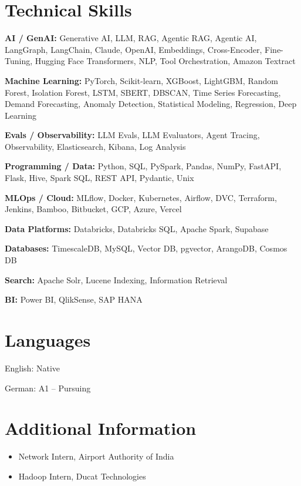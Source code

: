 \documentclass[10pt,a4paper]{article}
\begin{document}
\section{Technical Skills}
\textbf{AI / GenAI:} Generative AI, LLM, RAG, Agentic RAG, Agentic AI, LangGraph, LangChain, Claude, OpenAI, Embeddings, Cross-Encoder, Fine-Tuning, Hugging Face Transformers, NLP, Tool Orchestration, Amazon Textract\par
\textbf{Machine Learning:} PyTorch, Scikit-learn, XGBoost, LightGBM, Random Forest, Isolation Forest, LSTM, SBERT, DBSCAN, Time Series Forecasting, Demand Forecasting, Anomaly Detection, Statistical Modeling, Regression, Deep Learning\par
\textbf{Evals / Observability:} LLM Evals, LLM Evaluators, Agent Tracing, Observability, Elasticsearch, Kibana, Log Analysis\par
\textbf{Programming / Data:} Python, SQL, PySpark, Pandas, NumPy, FastAPI, Flask, Hive, Spark SQL, REST API, Pydantic, Unix\par
\textbf{MLOps / Cloud:} MLflow, Docker, Kubernetes, Airflow, DVC, Terraform, Jenkins, Bamboo, Bitbucket, GCP, Azure, Vercel\par
\textbf{Data Platforms:} Databricks, Databricks SQL, Apache Spark, Supabase\par
\textbf{Databases:} TimescaleDB, MySQL, Vector DB, pgvector, ArangoDB, Cosmos DB\par
\textbf{Search:} Apache Solr, Lucene Indexing, Information Retrieval\par
\textbf{BI:} Power BI, QlikSense, SAP HANA\par

\section{Languages}
English: Native\par
German: A1 -- Pursuing\par

\section{Additional Information}
\begin{itemize}
  \item Network Intern, Airport Authority of India
  \item Hadoop Intern, Ducat Technologies
\end{itemize}
\end{document}
